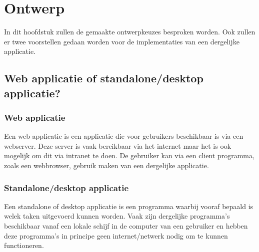 \documentclass[twoside,openright]{uva-bachelor-thesis}
\begin{document}
\chapter{Ontwerp}
	In dit hoofdstuk zullen de gemaakte ontwerpkeuzes besproken worden. Ook zullen er twee voorstellen gedaan worden voor de implementaties van een dergelijke applicatie.
	\section{Web applicatie of standalone/desktop applicatie?}
		\subsection{Web applicatie}
			Een web applicatie is een applicatie die voor gebruikers beschikbaar is via een webserver. Deze server is vaak bereikbaar via het internet maar het is ook mogelijk om dit via intranet te doen. De gebruiker kan via een client programma, zoals een webbrowser, gebruik maken van een dergelijke applicatie.
		\subsection{Standalone/desktop applicatie}
			Een standalone of desktop applicatie is een programma waarbij vooraf bepaald is welek taken uitgevoerd kunnen worden. Vaak zijn dergelijke programma's beschikbaar vanaf een lokale schijf in de computer van een gebruiker en hebben deze programma's in principe geen internet/netwerk nodig om te kunnen functioneren.
\end{document}

